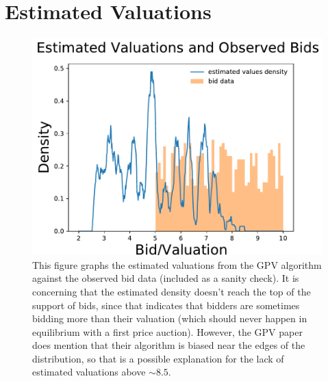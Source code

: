 \documentclass[dvipsnames]{article}
\begin{document}
  \section{Estimated Valuations}
  \begin{figure}[htp]
    \centering
    \includegraphics{estimated_density.pdf}
    \caption{This figure graphs the estimated valuations from the GPV algorithm against the observed bid data (included as a sanity check). It is concerning that the estimated density doesn't reach the top of the support of bids, since that indicates that bidders are sometimes bidding more than their valuation (which should never happen in equilibrium with a first price auction). However, the GPV paper does mention that their algorithm is biased near the edges of the distribution, so that is a possible explanation for the lack of estimated valuations above $\sim 8.5$.}
  \end{figure}
  \newpage
\inputminted{python}{GPV_code.py}
\end{document}

